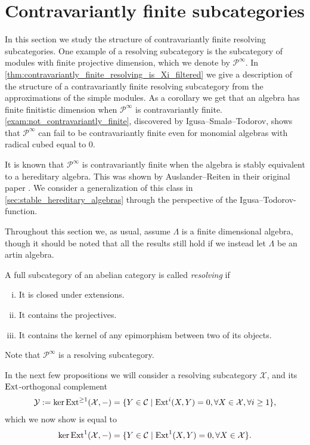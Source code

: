\section{Contravariantly finite subcategories}\label{sec:contravariantly_finite}


In this section we study the structure of contravariantly finite resolving subcategories. One example of a resolving subcategory is the subcategory of modules with finite projective dimension, which we denote by $\mathcal P^\infty$. In \cref{thm:contravariantly_finite_resolving_is_Xi_filtered} we give a description of the structure of a contravariantly finite resolving subcategory from the approximations of the simple modules. As a corollary we get that an algebra has finite finitistic dimension when $\mathcal P^\infty$ is contravariantly finite. \cref{exam:not_contravariantly_finite}, discovered by Igusa--Smalø--Todorov, shows that $\mathcal P^\infty$ can fail to be contravariantly finite even for monomial algebras with radical cubed equal to 0.

It is known that $\mathcal P^\infty$ is contravariantly finite when the algebra is stably equivalent to a hereditary algebra. This was shown by Auslander--Reiten in their original paper \cite{AR91}. We consider a generalization of this class in \cref{sec:stable_hereditary_algebras} through the perspective of the Igusa--Todorov-function.

Throughout this section we, as usual, assume $\Lambda$ is a finite dimensional algebra, though it should be noted that all the results still hold if we instead let $\Lambda$ be an artin algebra.

\begin{defn}[Resolving]
	A full subcategory of an abelian category is called \emph{resolving} if 
	\begin{enumerate}[i)]
		\item It is closed under extensions.
		\item It contains the projectives.
		\item It contains the kernel of any epimorphism between two of its objects.
	\end{enumerate}
\end{defn}

Note that $\mathcal P^\infty$ is a resolving subcategory.

In the next few propositions we will consider a resolving subcategory $\mathcal X$, and its $\operatorname{Ext}$-orthogonal complement
\begin{align*}
	\mathcal Y := \ker \operatorname{Ext}^{\geq 1}(\mathcal X, -) = \{Y \in \mathcal C \mid \operatorname{Ext}^i(X, Y)=0, \forall X \in \mathcal X, \forall i \geq 1\},
\end{align*}
which we now show is equal to 
\begin{align*}
\ker \operatorname{Ext}^1(\mathcal X, -) = \{Y \in \mathcal C \mid \operatorname{Ext}^1(X, Y)=0, \forall X \in \mathcal X\}.
\end{align*}

